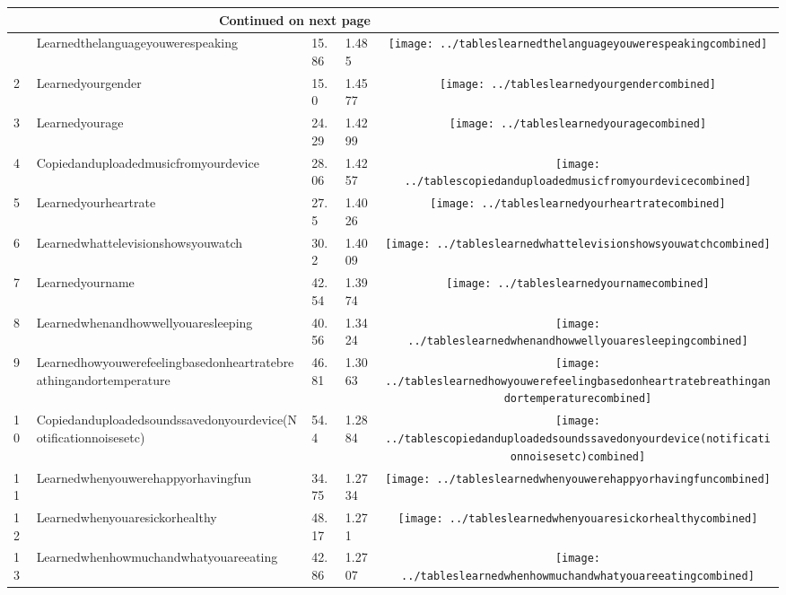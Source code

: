 \documentclass[a4paper,12pt]{article}
\begin{document}
\begin{longtable}{| p{0.5cm} | p{7cm} | p{1cm} |p{1cm} | c |}
\hline \multicolumn{4}{|r|}{{Continued on next page}} \\ \hline
\endfoot
\hline 
\endlastfoot
1 & Learnedthelanguageyouwerespeaking & 15.86 & 1.485&\texttt{[image: ../tableslearnedthelanguageyouwerespeakingcombined]} \\ 
2 & Learnedyourgender & 15.0 & 1.4577&\texttt{[image: ../tableslearnedyourgendercombined]} \\ 
3 & Learnedyourage & 24.29 & 1.4299&\texttt{[image: ../tableslearnedyouragecombined]} \\ 
4 & Copiedanduploadedmusicfromyourdevice & 28.06 & 1.4257&\texttt{[image: ../tablescopiedanduploadedmusicfromyourdevicecombined]} \\ 
5 & Learnedyourheartrate & 27.5 & 1.4026&\texttt{[image: ../tableslearnedyourheartratecombined]} \\ 
6 & Learnedwhattelevisionshowsyouwatch & 30.2 & 1.4009&\texttt{[image: ../tableslearnedwhattelevisionshowsyouwatchcombined]} \\ 
7 & Learnedyourname & 42.54 & 1.3974&\texttt{[image: ../tableslearnedyournamecombined]} \\ 
8 & Learnedwhenandhowwellyouaresleeping & 40.56 & 1.3424&\texttt{[image: ../tableslearnedwhenandhowwellyouaresleepingcombined]} \\ 
9 & Learnedhowyouwerefeelingbasedonheartratebreathingandortemperature & 46.81 & 1.3063&\texttt{[image: ../tableslearnedhowyouwerefeelingbasedonheartratebreathingandortemperaturecombined]} \\ 
10 & Copiedanduploadedsoundssavedonyourdevice(Notificationnoisesetc) & 54.4 & 1.2884&\texttt{[image: ../tablescopiedanduploadedsoundssavedonyourdevice(notificationnoisesetc)combined]} \\ 
11 & Learnedwhenyouwerehappyorhavingfun & 34.75 & 1.2734&\texttt{[image: ../tableslearnedwhenyouwerehappyorhavingfuncombined]} \\ 
12 & Learnedwhenyouaresickorhealthy & 48.17 & 1.271&\texttt{[image: ../tableslearnedwhenyouaresickorhealthycombined]} \\ 
13 & Learnedwhenhowmuchandwhatyouareeating & 42.86 & 1.2707&\texttt{[image: ../tableslearnedwhenhowmuchandwhatyouareeatingcombined]} \\ 

\end{longtable}
\end{document}
